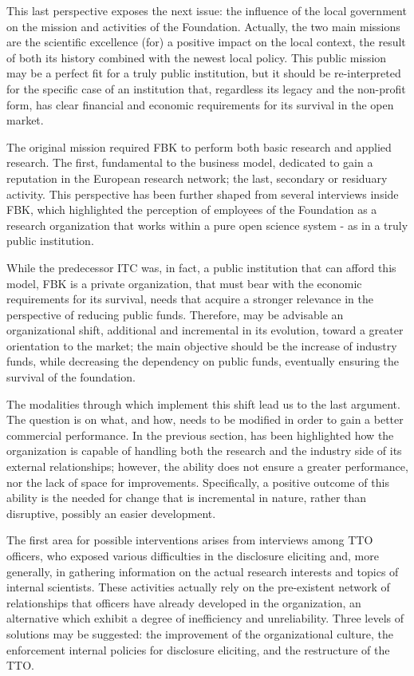 This last perspective exposes the next issue: the influence of the local government on the mission and activities of the Foundation. Actually, the two main missions are the scientific excellence (for) a positive impact on the local context, the result of both its history combined with the newest local policy. This public mission may be a perfect fit for a truly public institution, but it should be re-interpreted for the specific case of an institution that, regardless its legacy and the non-profit form, has clear financial and economic requirements for its survival in the open market. 

The original mission required FBK to perform both basic research and applied research. The first, fundamental to the business model, dedicated to gain a reputation in the European research network; the last, secondary or residuary activity. This perspective has been further shaped from several interviews inside FBK, which highlighted the perception of employees of the Foundation as a research organization that works within a pure open science system - as in a truly public institution. 

While the predecessor ITC was, in fact, a public institution that can afford this model, FBK is a private organization, that must bear with the economic requirements for its survival, needs that acquire a stronger relevance in the perspective of reducing public funds. Therefore, may be advisable an organizational shift, additional and incremental in its evolution, toward a greater orientation to the market; the main objective should be the increase of industry funds, while decreasing the dependency on public funds, eventually ensuring the survival of the foundation.

The modalities through which implement this shift lead us to the last argument. The question is on what, and how, needs to be modified in order to gain a better commercial performance. In the previous section, has been highlighted how the organization is capable of handling both the research and the industry side of its external relationships; however, the ability does not ensure a greater performance, nor the lack of space for improvements. Specifically, a positive outcome of this ability is the needed for change that is incremental in nature, rather than disruptive, possibly an easier development.

The first area for possible interventions arises from interviews among TTO officers, who exposed various difficulties in the disclosure eliciting and, more generally, in gathering information on the actual research interests and topics of internal scientists. These activities actually rely on the pre-existent network of relationships that officers have already developed in the organization, an alternative which exhibit a degree of inefficiency and unreliability. Three levels of solutions may be suggested: the improvement of the organizational culture, the enforcement internal policies for disclosure eliciting, and the restructure of the TTO.

